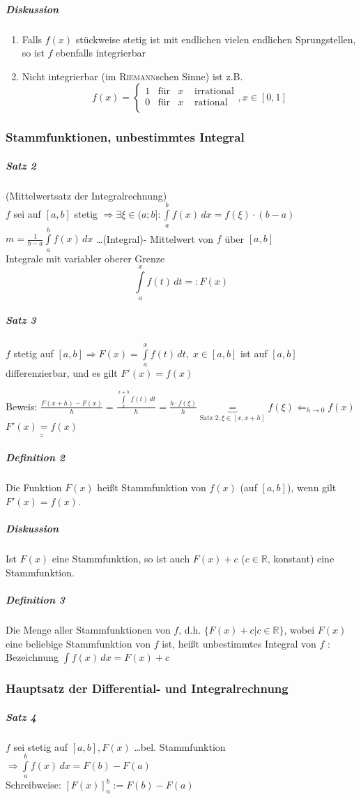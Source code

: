 \documentclass[a4paper]{scrartcl}
\begin{document}
\subparagraph{Diskussion}
\begin{enumerate}
\item Falls $f(x)$ stückweise stetig ist mit endlichen vielen endlichen Sprungstellen, so ist $f$ ebenfalls integrierbar
\item Nicht integrierbar (im \textsc{Riemann}schen Sinne) ist z.B.
\[f(x) = \left\{ \begin{array}{lccr} 1 & \mbox{für} & x & \text{ irrational}\\ 0 & \mbox{für} & x & \text{ rational} \\ \end{array} \right. , x \in [0,1] \]
\end{enumerate}

\subsubsection{Stammfunktionen, unbestimmtes Integral}
\subparagraph{Satz 2}(Mittelwertsatz der Integralrechnung)\\
$f$ sei auf $[a,b]$ stetig $\Rightarrow \exists \xi \in (a;b]: \int\limits_a^b f(x) \, dx = f(\xi) \cdot (b-a)$\\
$m = \frac{1}{b-a} \int\limits_a^b f(x) \, dx$ \dots (Integral)- Mittelwert von $f$ über $[a,b]$\\
Integrale mit variabler oberer Grenze\\
\[ \int\limits_a^x f(t) \, dt =: F(x) \]

\subparagraph{Satz 3} $f$ stetig auf $[a,b] \Rightarrow F(x) = \int\limits_a^x f(t) \, dt, \; x \in [a,b]$ ist auf $[a,b]$ differenzierbar, und es gilt $F'(x) = f(x)$

Beweis: $\frac{F(x+h) - F(x)}{h} = \frac{\int\limits_{x}^{x+h} f(t) \, dt}{h} = \frac{h \cdot f(\xi)}{h} \underbrace{=}_{\text{Satz 2}, \xi \in [x,x+h]} f(\xi) \Leftarrow_{h \to 0} f(x)$
$\underline{\underline{F'(x) = f(x)}}$

\subparagraph{Definition 2} Die Funktion $F(x)$ heißt Stammfunktion von $f(x)$ (auf $[a,b]$), wenn gilt $F'(x) = f(x)$.
\subparagraph{Diskussion} Ist $F(x)$ eine Stammfunktion, so ist auch $F(x) + c$ ($c \in \mathbb{R}$, konstant) eine Stammfunktion.
\subparagraph{Definition 3} Die Menge aller Stammfunktionen von $f$, d.h. $\{ F(x) +c | c \in \mathbb{R} \}$, wobei $F(x)$ eine beliebige Stammfunktion von $f$ ist, heißt unbestimmtes Integral von $f$ :\\
Bezeichnung $\int f(x) \, dx = F(x) +c $

\subsubsection{Hauptsatz der Differential- und Integralrechnung}
\subparagraph{Satz 4} $f$ sei stetig auf $[a,b], F(x)$ \dots bel. Stammfunktion $\Rightarrow \int\limits_a^b f(x) \, dx = F(b) - F(a)$\\
Schreibweise: $[ F(x)]_a^b := F(b) - F(a)$
\end{document}
